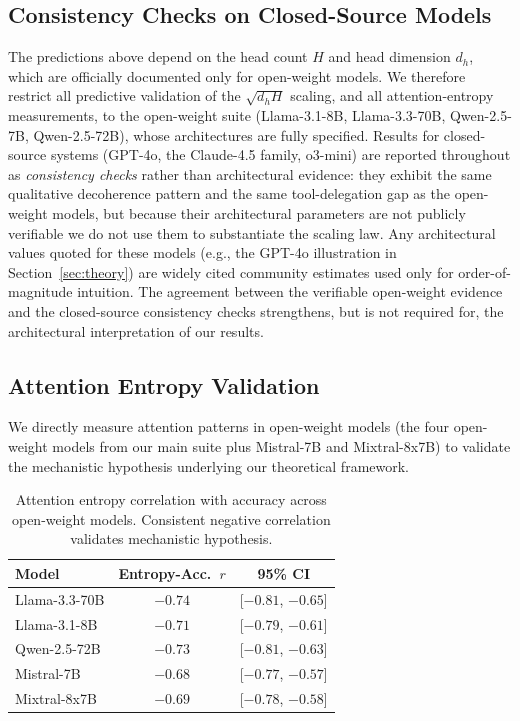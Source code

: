 \documentclass{article}
\theoremstyle{plain}
\theoremstyle{definition}
\theoremstyle{remark}
\begin{document}
\subsection{Consistency Checks on Closed-Source Models}
\label{sec:consistency}
The predictions above depend on the head count $H$ and head dimension $d_h$, which are officially documented only for open-weight models. We therefore restrict all predictive validation of the $\sqrt{d_h H}$ scaling, and all attention-entropy measurements, to the open-weight suite (Llama-3.1-8B, Llama-3.3-70B, Qwen-2.5-7B, Qwen-2.5-72B), whose architectures are fully specified. Results for closed-source systems (GPT-4o, the Claude-4.5 family, o3-mini) are reported throughout as \emph{consistency checks} rather than architectural evidence: they exhibit the same qualitative decoherence pattern and the same tool-delegation gap as the open-weight models, but because their architectural parameters are not publicly verifiable we do not use them to substantiate the scaling law. Any architectural values quoted for these models (e.g., the GPT-4o illustration in Section~\ref{sec:theory}) are widely cited community estimates used only for order-of-magnitude intuition. The agreement between the verifiable open-weight evidence and the closed-source consistency checks strengthens, but is not required for, the architectural interpretation of our results.

\subsection{Attention Entropy Validation}
\label{sec:validation}

We directly measure attention patterns in open-weight models (the four open-weight models from our main suite plus Mistral-7B and Mixtral-8x7B) to validate the mechanistic hypothesis underlying our theoretical framework.

\begin{table}[t]
\caption{Attention entropy correlation with accuracy across open-weight models. Consistent negative correlation validates mechanistic hypothesis.}
\label{tab:attention}
\vskip 0.1in
\centering
\footnotesize
\begin{tabular}{@{}lcc@{}}
\toprule
\textbf{Model} & \textbf{Entropy-Acc.\ $r$} & \textbf{95\% CI} \\
\midrule
Llama-3.3-70B & $-0.74$ & [$-0.81$, $-0.65$] \\
Llama-3.1-8B & $-0.71$ & [$-0.79$, $-0.61$] \\
Qwen-2.5-72B & $-0.73$ & [$-0.81$, $-0.63$] \\
Mistral-7B & $-0.68$ & [$-0.77$, $-0.57$] \\
Mixtral-8x7B & $-0.69$ & [$-0.78$, $-0.58$] \\
\bottomrule
\end{tabular}
\vskip -0.1in
\end{table}
\end{document}
